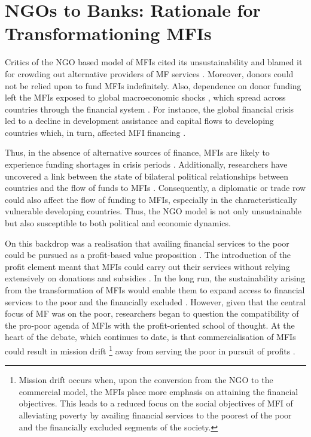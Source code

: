 \documentclass[a4paper,nobind]{templates/ociamthesis}
\begin{document}
\hypertarget{ngos-to-banks-rationale-for-transformationing-mfis}{%
\section{NGOs to Banks: Rationale for Transformationing MFIs}\label{ngos-to-banks-rationale-for-transformationing-mfis}}

\noindent Critics of the NGO based model of MFIs cited its unsustainability and blamed it for crowding out alternative providers of MF services \autocite{kota2007microfinance}. Moreover, donors could not be relied upon to fund MFIs indefinitely. Also, dependence on donor funding left the MFIs exposed to global macroeconomic shocks \autocite{d2017ngos}, which spread across countries through the financial system \autocite{schnabl2012international}. For instance, the global financial crisis led to a decline in development assistance and capital flows to developing countries which, in turn, affected MFI financing \autocite{leach2012global,wagner2013vulnerability}.

Thus, in the absence of alternative sources of finance, MFIs are likely to experience funding shortages in crisis periods \autocite{constantinou2011financial}. Additionally, researchers have uncovered a link between the state of bilateral political relationships between countries and the flow of funds to MFIs \autocite{garmaise2013cheap}. Consequently, a diplomatic or trade row could also affect the flow of funding to MFIs, especially in the characteristically vulnerable developing countries. Thus, the NGO model is not only unsustainable but also susceptible to both political and economic dynamics.

On this backdrop was a realisation that availing financial services to the poor could be pursued as a profit-based value proposition \autocite{rhyne1999microfinance}. The introduction of the profit element meant that MFIs could carry out their services without relying extensively on donations and subsidies \autocite{duvendack2015mis}. In the long run, the sustainability arising from the transformation of MFIs would enable them to expand access to financial services to the poor and the financially excluded \autocite{brown2012microfinance,sarma2011ngo}. However, given that the central focus of MF was on the poor, researchers began to question the compatibility of the pro-poor agenda of MFIs with the profit-oriented school of thought. At the heart of the debate, which continues to date, is that commercialisation of MFIs could result in mission drift \footnote{Mission drift occurs when, upon the conversion from the NGO to the commercial model, the MFIs place more emphasis on attaining the financial objectives. This leads to a reduced focus on the social objectives of MFI of alleviating poverty by availing financial services to the poorest of the poor and the financially excluded segments of the society.} away from serving the poor in pursuit of profits \autocite{im2015profits,mia2017mission}.
\end{document}

